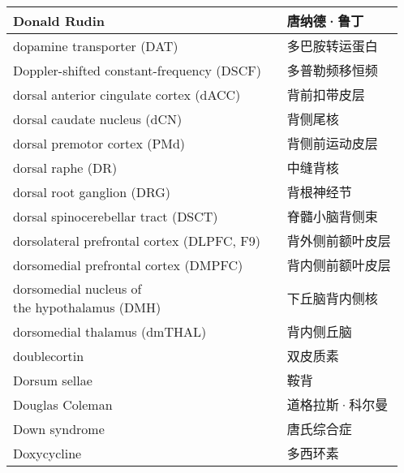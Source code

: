 \begin{longtable}{lll}
	\midrule
	Donald Rudin    &&  唐纳德·鲁丁  \\
	
	\midrule
	dopamine transporter (DAT)     &&  多巴胺转运蛋白  \\
	
	\midrule
	Doppler-shifted constant-frequency (DSCF)     &&  多普勒频移恒频  \\
	
	\midrule
	dorsal anterior cingulate cortex (dACC)     &&  背前扣带皮层  \\
	
	\midrule
	dorsal caudate nucleus (dCN)     &&  背侧尾核  \\
	
	\midrule
	dorsal premotor cortex (PMd)     &&  背侧前运动皮层  \\
	
	\midrule
	dorsal raphe (DR)     &&  中缝背核  \\
	
	\midrule
	dorsal root ganglion (DRG)     &&  背根神经节  \\
	
	\midrule
	dorsal spinocerebellar tract (DSCT)     &&  脊髓小脑背侧束  \\
	
	\midrule
	dorsolateral prefrontal cortex (DLPFC, F9)     &&  背外侧前额叶皮层  \\
	
	\midrule
	dorsomedial prefrontal cortex (DMPFC)     &&  背内侧前额叶皮层  \\
	
	\midrule
	\makecell[l]{dorsomedial nucleus of \\the hypothalamus (DMH)}    &&  下丘脑背内侧核  \\
	
	\midrule
	dorsomedial thalamus (dmTHAL)     &&  背内侧丘脑  \\
	
	\midrule
	doublecortin     &&  双皮质素  \\
	
	\midrule
	Dorsum sellae     &&  鞍背  \\
	
	\midrule
	Douglas Coleman     &&  道格拉斯·科尔曼  \\
	
	\midrule
	Down syndrome     &&  唐氏综合症  \\
	
	\midrule
	Doxycycline     &&  多西环素  \\
	

\end{longtable}
